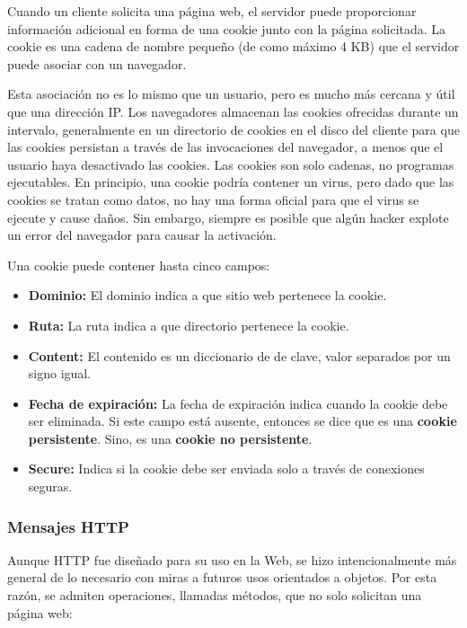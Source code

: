 Cuando un cliente solicita una página web, el servidor puede proporcionar información adicional en forma de una cookie junto con la página solicitada. La cookie es una cadena de nombre pequeño (de como máximo 4 KB) que el servidor puede asociar con un navegador.

Esta asociación no es lo mismo que un usuario, pero es mucho más cercana y útil que una dirección IP. Los navegadores almacenan las cookies ofrecidas durante un intervalo, generalmente en un directorio de cookies en el disco del cliente para que las cookies persistan a través de las invocaciones del navegador, a menos que el usuario haya desactivado las cookies. Las cookies son solo cadenas, no programas ejecutables. En principio, una cookie podría contener un virus, pero dado que las cookies se tratan como datos, no hay una forma oficial para que el virus se ejecute y cause daños. Sin embargo, siempre es posible que algún hacker explote un error del navegador para causar la activación.

Una cookie puede contener hasta cinco campos:
\begin{itemize}
  \item \textbf{Dominio:} El dominio indica a que sitio web pertenece la cookie.
  \item \textbf{Ruta:} La ruta indica a que directorio pertenece la cookie.
  \item \textbf{Content:} El contenido es un diccionario de de clave, valor separados por un signo igual.
  \item \textbf{Fecha de expiración:} La fecha de expiración indica cuando la cookie debe ser eliminada. Si este campo está ausente, entonces se dice que es una \textbf{cookie persistente}. Sino, es una \textbf{cookie no persistente}.
  \item \textbf{Secure:} Indica si la cookie debe ser enviada solo a través de conexiones seguras.
\end{itemize}

\subsubsection{Mensajes HTTP}

Aunque HTTP fue diseñado para su uso en la Web, se hizo intencionalmente más general de lo necesario con miras a futuros usos orientados a objetos. Por esta razón, se admiten operaciones, llamadas métodos, que no solo solicitan una página web:

